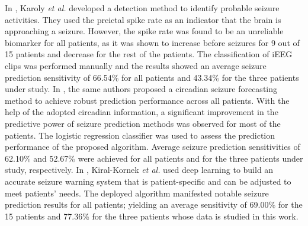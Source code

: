 \documentclass[journal]{IEEEtran}
\begin{document}
In \cite{karoly2016interictal}, Karoly \textit{et al.} developed a detection method to identify probable seizure activities. They used the preictal spike rate as an indicator that the brain is approaching a seizure. However, the spike rate was found to be an unreliable biomarker for all patients, as it was shown to increase before seizures for 9 out of 15 patients and decrease for the rest of the patients. The classification of iEEG clips was performed manually and the results showed an average seizure prediction sensitivity of 66.54\% for all patients and 43.34\% for the three patients under study.
In \cite{karoly2017circadian}, the same authors proposed a circadian seizure forecasting method to achieve robust prediction performance across all patients. With the help of the adopted circadian information, a significant improvement in the predictive power of seizure prediction methods was observed for most of the patients. The logistic regression classifier was used to assess the prediction performance of the proposed algorithm. Average seizure prediction sensitivities of 62.10\% and 52.67\% were achieved for all patients and for the three patients under study, respectively. In \cite{kiral2018epileptic}, Kiral-Kornek \textit{et al.} used deep learning to build an accurate seizure warning system that is patient-specific and can be adjusted to meet patients' needs. The deployed algorithm manifested notable seizure prediction results for all patients; yielding an average sensitivity of 69.00\% for the 15 patients and 77.36\% for the three patients whose data is studied in this work.
\end{document}
